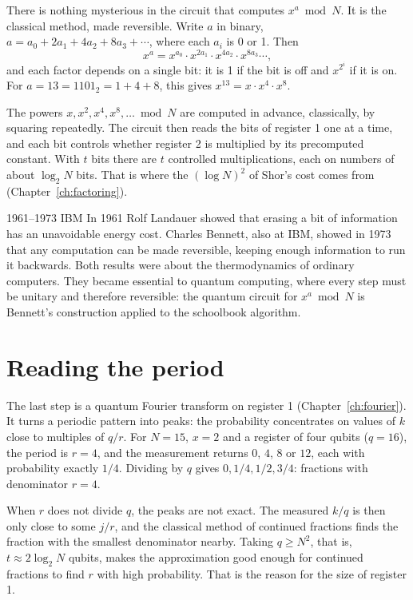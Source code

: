 There is nothing mysterious in the circuit that computes $x^a \bmod N$. It is the
classical method, made reversible. Write $a$ in binary,
$a = a_0 + 2a_1 + 4a_2 + 8a_3 + \cdots$, where each $a_i$ is 0 or 1. Then
\[
  x^a = x^{a_0}\cdot x^{2a_1}\cdot x^{4a_2}\cdot x^{8a_3}\cdots,
\]
and each factor depends on a single bit: it is 1 if the bit is off and
$x^{2^i}$ if it is on. For $a = 13 = 1101_2 = 1 + 4 + 8$, this gives
$x^{13} = x\cdot x^4\cdot x^8$.

The powers $x, x^2, x^4, x^8, \dots \bmod N$ are computed in advance, classically,
by squaring repeatedly. The circuit then reads the bits of register 1 one at a
time, and each bit controls whether register 2 is multiplied by its precomputed
constant. With $t$ bits there are $t$ controlled multiplications, each on numbers
of about $\log_2 N$ bits. That is where the $(\log N)^2$ of Shor's cost comes from
(Chapter~\ref{ch:factoring}).

\begin{history}{1961--1973 \textperiodcentered{} IBM}
In 1961 Rolf Landauer showed that erasing a bit of information has an unavoidable
energy cost. Charles Bennett, also at IBM, showed in 1973 that any computation can
be made reversible, keeping enough information to run it backwards. Both results
were about the thermodynamics of ordinary computers. They became essential to
quantum computing, where every step must be unitary and therefore reversible: the
quantum circuit for $x^a \bmod N$ is Bennett's construction applied to the
schoolbook algorithm.
\end{history}

\section{Reading the period}

The last step is a quantum Fourier transform on register 1 (Chapter~\ref{ch:fourier}).
It turns a periodic pattern into peaks: the probability concentrates on values of
$k$ close to multiples of $q/r$. For $N = 15$, $x = 2$ and a register of four
qubits ($q = 16$), the period is $r = 4$, and the measurement returns $0$, $4$, $8$
or $12$, each with probability exactly $1/4$. Dividing by $q$ gives
$0, 1/4, 1/2, 3/4$: fractions with denominator $r = 4$.

When $r$ does not divide $q$, the peaks are not exact. The measured $k/q$ is then
only close to some $j/r$, and the classical method of continued fractions finds the
fraction with the smallest denominator nearby. Taking $q \geq N^2$, that is,
$t \approx 2\log_2 N$ qubits, makes the approximation good enough for continued
fractions to find $r$ with high probability. That is the reason for the size of
register 1.

